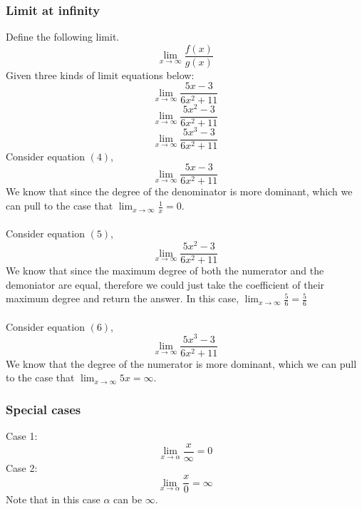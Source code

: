 \documentclass{article}
\begin{document}
\subsubsection{Limit at infinity}
Define the following limit.
\begin{equation*}
  \lim_{x \to \infty} \frac{f(x)}{g(x)} 
\end{equation*}
Given three kinds of limit equations below:
\begin{equation} \label{eq:1}
  \lim_{x \to \infty} \frac{5x-3}{6x^2+11}
\end{equation}
\begin{equation} \label{eq:2}
  \lim_{x \to \infty} \frac{5x^2-3}{6x^2+11}
\end{equation}
\begin{equation} \label{eq:3}
  \lim_{x \to \infty} \frac{5x^3-3}{6x^2+11}
\end{equation}
Consider equation $(4)$,
\begin{equation*}
  \lim_{x \to \infty} \frac{5x-3}{6x^2+11}
\end{equation*}
We know that since the degree of the denominator is more dominant, which we can pull to the case that $\lim_{x \to \infty} \frac{1}{x} = 0$.
\\\\
Consider equation $(5)$,
\begin{equation*}
  \lim_{x \to \infty} \frac{5x^2-3}{6x^2+11}
\end{equation*}
We know that since the maximum degree of both the numerator and the demoniator are equal, therefore we could just take the coefficient of their maximum degree and return the answer. In this case, $\lim_{x \to \infty} \frac{5}{6} = \frac{5}{6}$
\\\\
Consider equation $(6)$,
\begin{equation*}
  \lim_{x \to \infty} \frac{5x^3-3}{6x^2+11}
\end{equation*}
We know that the degree of the numerator is more dominant, which we can pull to the case that $\lim_{x \to \infty} 5x = \infty$.
\subsubsection{Special cases}
Case 1:
\begin{equation*}
  \lim_{x \to \alpha} \frac{x}{\infty} = 0
\end{equation*}
Case 2:
\begin{equation*}
  \lim_{x \to \alpha} \frac{x}{0} = \infty
\end{equation*}
Note that in this case $\alpha$ can be $\infty$.\\
\end{document}
